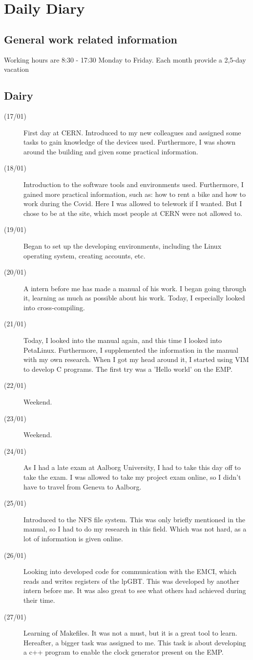 \chapter{Daily Diary}\label{ch:appDiary}
\section*{General work related information}
 Working hours are 8:30 - 17:30 Monday to Friday. \newline
 Each month provide a 2,5-day vacation
\section*{Dairy}
\begin{description}
\item[(17/01)] First day at CERN. Introduced to my new colleagues and assigned some tasks to gain knowledge of the devices used. Furthermore, I was shown around the building and given some practical information.
\item[(18/01)] Introduction to the software tools and environments used. Furthermore, I gained more practical information, such as: how to rent a bike and how to work during the Covid. Here I was allowed to telework if I wanted. But I chose to be at the site, which most people at CERN were not allowed to.
\item[(19/01)] Began to set up the developing environments, including the Linux operating system, creating accounts, etc. 
\item[(20/01)] A intern before me has made a manual of his work. I began going through it, learning as much as possible about his work. Today, I especially looked into cross-compiling. 
\item[(21/01)] Today, I looked into the manual again, and this time I looked into PetaLinux. Furthermore, I supplemented the information in the manual with my own research. When I got my head around it, I started using VIM to develop C programs. The first try was a 'Hello world' on the EMP.
\item[(22/01)] Weekend.
\item[(23/01)] Weekend.
\item[(24/01)] As I had a late exam at Aalborg University, I had to take this day off to take the exam. I was allowed to take my project exam online, so I didn't have to travel from Geneva to Aalborg.
\item[(25/01)] Introduced to the NFS file system. This was only briefly mentioned in the manual, so I had to do my research in this field. Which was not hard, as a lot of information is given online. 
\item[(26/01)] Looking into developed code for communication with the EMCI, which reads and writes registers of the lpGBT. This was developed by another intern before me. It was also great to see what others had achieved during their time. 
\item[(27/01)] Learning of Makefiles. It was not a must, but it is a great tool to learn. Hereafter, a bigger task was assigned to me. This task is about developing a c++ program to enable the clock generator present on the EMP.


\end{description}
